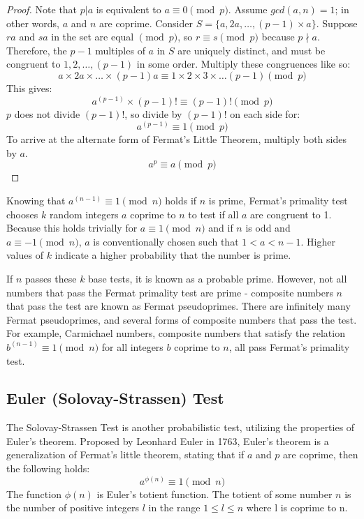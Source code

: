 \documentclass{article}
\begin{document}
\begin{proof} %
Note that $p \vert a$ is equivalent to $a \equiv 0 \pmod{p}$.
Assume $gcd(a, n) = 1$; in other words, $a$ and $n$ are coprime.
Consider $S = \{a, 2a, \ldots{}, (p - 1) \times a\}$.
Suppose $ra$ and $sa$ in the set are equal $\pmod{p}$, so $r \equiv s \pmod{p}$ because $p \nmid a$.
Therefore, the $p - 1$ multiples of $a$ in $S$ are uniquely distinct, and must be congruent to ${1, 2, \ldots{}, (p - 1)}$ in some order.
Multiply these congruences like so:
    \[a \times 2a \times \ldots{} \times (p - 1)a \equiv 1 \times 2 \times 3 \times \ldots{} (p - 1) \pmod{p}\]
This gives:
    \[a^{(p - 1)} \times (p - 1)! \equiv (p - 1)! \pmod{p}\]
$p$ does not divide $(p - 1)!$, so divide by $(p - 1)!$ on each side for:
    \[a^{(p - 1)} \equiv 1 \pmod{p}\]
To arrive at the alternate form of Fermat's Little Theorem, multiply both sides by $a$.
    \[a^p \equiv a \pmod{p}\]
\end{proof}

Knowing that $a^{(n - 1)} \equiv 1 \pmod{n}$ holds if $n$ is prime, Fermat's primality test chooses $k$ random integers $a$ coprime to $n$ to test if all $a$ are congruent to 1. Because this holds trivially for $a \equiv 1 \pmod{n}$ and if $n$ is odd and $a \equiv -1 \pmod{n}$, $a$ is conventionally chosen such that $1 < a < n - 1$. Higher values of $k$ indicate a higher probability that the number is prime.

If $n$ passes these $k$ base tests, it is known as a probable prime. However, not all numbers that pass the Fermat primality test are prime - composite numbers $n$ that pass the test are known as Fermat pseudoprimes. There are infinitely many Fermat pseudoprimes, and several forms of composite numbers that pass the test. For example, Carmichael numbers, composite numbers that satisfy the relation $b^{(n-1)} \equiv 1 \pmod{n}$ for all integers $b$ coprime to $n$, all pass Fermat's primality test.

\subsection{Euler (Solovay-Strassen) Test} %
The Solovay-Strassen Test is another probabilistic test, utilizing the properties of Euler's theorem. Proposed by Leonhard Euler in 1763, Euler's theorem is a generalization of Fermat's little theorem, stating that if $a$ and $p$ are coprime, then the following holds:
\[
    a^{\phi(n)} \equiv 1 \pmod{n}
\]
The function $\phi(n)$ is Euler's totient function. The totient of some number $n$ is the number of positive integers $l$ in the range $1 \leq l \leq n$ where l is coprime to n.
\end{document}
